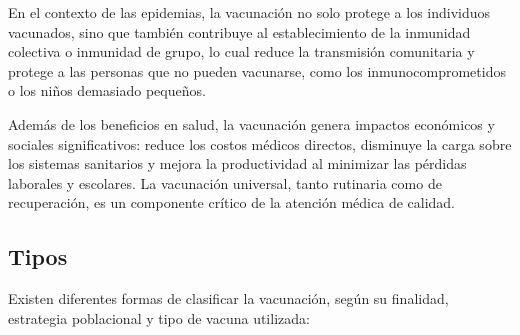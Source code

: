 En el contexto de las epidemias, la vacunación no solo protege a los individuos vacunados, sino que también contribuye al establecimiento de la inmunidad colectiva o inmunidad de grupo, lo cual reduce la transmisión comunitaria y protege a las personas que no pueden vacunarse, como los inmunocomprometidos o los niños demasiado pequeños.

Además de los beneficios en salud, la vacunación genera impactos económicos y sociales significativos: reduce los costos médicos directos, disminuye la carga sobre los sistemas sanitarios y mejora la productividad al minimizar las pérdidas laborales y escolares. La vacunación universal, tanto rutinaria como de recuperación, es un componente crítico de la atención médica de calidad.

\subsection{Tipos}
Existen diferentes formas de clasificar la vacunación, según su finalidad, estrategia poblacional y tipo de vacuna utilizada:
